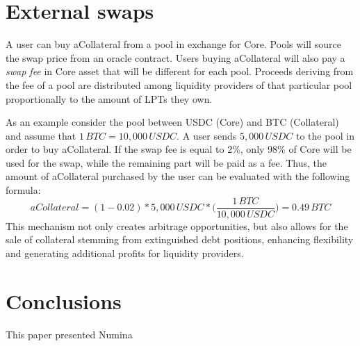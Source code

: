 \documentclass[12pt]{paper}
\begin{document}
\section{External swaps}
\label{sec:extswap}
	A user can buy aCollateral from a pool in exchange for Core. Pools will source the swap price from an oracle contract. Users buying aCollateral will also pay a \textit{swap fee} in Core asset that will be different for each pool. Proceeds deriving from the fee of a pool are distributed among liquidity providers of that particular pool proportionally to the amount of LPTs they own.
	\par As an example consider the pool between USDC (Core) and BTC (Collateral) and assume that $1 \, BTC = 10,000 \, USDC$. A user sends $5,000 \, USDC$ to the pool in order to buy aCollateral. If the swap fee is equal to 2\%, only 98\% of Core will be used for the swap, while the remaining part will be paid as a fee. Thus, the amount of aCollateral purchased by the user can be evaluated with the following formula:
	\begin{equation*}
		aCollateral = (1 - 0.02) * 5,000\,USDC * \Big(\frac{1\,BTC}{10,000\,USDC} \Big) = 0.49\,BTC
	\end{equation*}
	This mechanism not only creates arbitrage opportunities, but also allows for the sale of collateral stemming from extinguished debt positions, enhancing flexibility and generating additional profits for liquidity providers.

\section{Conclusions}
\label{sec:conclusions}

	This paper presented Numina
\end{document}
